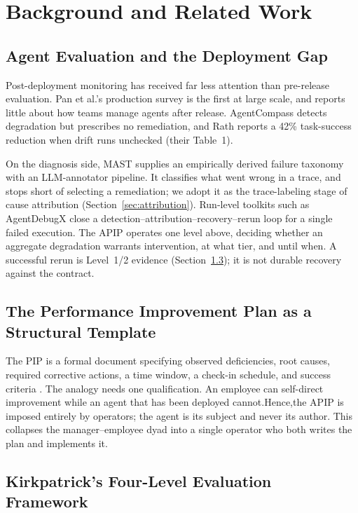 \documentclass[conference]{IEEEtran}
\begin{document}
\section{Background and Related Work}

\subsection{Agent Evaluation and the Deployment Gap}

Post-deployment monitoring has received far less attention than pre-release
evaluation. Pan et al.'s production survey \cite{pan2025} is the first at large
scale, and reports little about how teams manage agents after release.
AgentCompass \cite{kartik2025} detects degradation but prescribes no
remediation, and Rath \cite{rath2026} reports a 42\% task-success reduction
when drift runs unchecked (their Table~1).

On the diagnosis side, MAST \cite{cemri2025} supplies an empirically derived
failure taxonomy with an LLM-annotator pipeline. It classifies what went wrong
in a trace, and stops short of selecting a remediation; we adopt it as the
trace-labeling stage of cause attribution (Section~\ref{sec:attribution}).
Run-level toolkits such as AgentDebugX \cite{zhu2026} close a
detection--attribution--recovery--rerun loop for a single failed execution. The
APIP operates one level above, deciding whether an aggregate degradation
warrants intervention, at what tier, and until when. A successful rerun is
Level~1/2 evidence (Section~\ref{sec:kirkpatrick}); it is not durable recovery
against the contract.

\subsection{The Performance Improvement Plan as a Structural Template}
\label{sec:pip}

The PIP is a formal document specifying observed deficiencies, root causes,
required corrective actions, a time window, a check-in schedule, and success
criteria \cite{shrm2023}.
The analogy needs one qualification. An employee can self-direct improvement while 
an agent that has been deployed cannot.Hence,the APIP is imposed entirely by operators;
the agent is its subject and never its author. This collapses the manager–employee
dyad into a single operator who both writes the plan and implements it.

\subsection{Kirkpatrick's Four-Level Evaluation Framework}
\label{sec:kirkpatrick}
\end{document}
